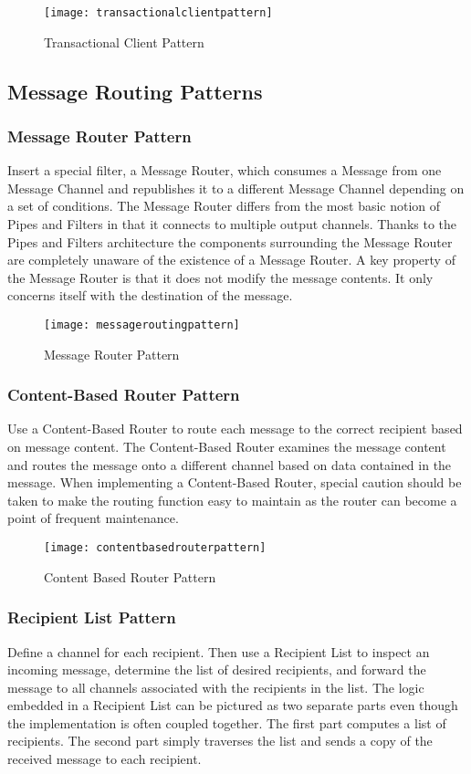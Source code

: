 \begin{figure}[H]
  \center
  \texttt{[image: transactionalclientpattern]}
  \caption{Transactional Client Pattern}
\end{figure}

\pagebreak

\subsection{Message Routing Patterns}

\subsubsection{Message Router Pattern}
Insert a special filter, a Message Router, which consumes a Message from one Message Channel and republishes it to a different Message Channel depending on a set of conditions. The Message Router differs from the most basic notion of Pipes and Filters in that it connects to multiple output channels. Thanks to the Pipes and Filters architecture the components surrounding the Message Router are completely unaware of the existence of a Message Router. A key property of the Message Router is that it does not modify the message contents. It only concerns itself with the destination of the message.

\begin{figure}[H]
  \center
  \texttt{[image: messageroutingpattern]}
  \caption{Message Router Pattern}
\end{figure}

\subsubsection{Content-Based Router Pattern}
Use a Content-Based Router to route each message to the correct recipient based on message content. The Content-Based Router examines the message content and routes the message onto a different channel based on data contained in the message. When implementing a Content-Based Router, special caution should be taken to make the routing function easy to maintain as the router can become a point of frequent maintenance.

\begin{figure}[H]
  \center
  \texttt{[image: contentbasedrouterpattern]}
  \caption{Content Based Router Pattern}
\end{figure}

\subsubsection{Recipient List Pattern}
Define a channel for each recipient. Then use a Recipient List to inspect an incoming message, determine the list of desired recipients, and forward the message to all channels associated with the recipients in the list. The logic embedded in a Recipient List can be pictured as two separate parts even though the implementation is often coupled together. The first part computes a list of recipients. The second part simply traverses the list and sends a copy of the received message to each recipient.

